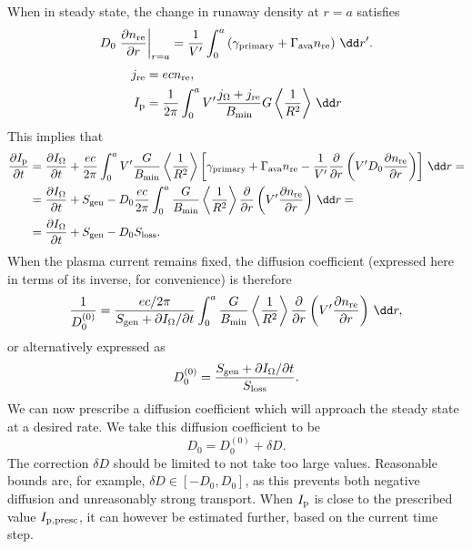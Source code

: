 \documentclass{notes}
\begin{document}
	When in steady state, the change in runaway density at $r=a$ satisfies
	\begin{equation}
		D_0\left.\frac{\partial n_{\rm re}}{\partial r}\right|_{r=a} =
			\frac{1}{V'}\int_0^a \left(
				\gamma_{\rm primary} + \Gamma_{\rm ava}n_{\rm re}
			\right)\,\dd r'.
	\end{equation}
	\begin{equation}
		\begin{aligned}
			j_{\rm re} &= ec n_{\rm re},\\
			I_{\rm p} &= \frac{1}{2\pi}\int_0^a
				V'\frac{j_\Omega + j_{\rm re}}{B_{\rm min}}G
				\left\langle\frac{1}{R^2}\right\rangle\,\dd r
		\end{aligned}
	\end{equation}
	This implies that
	\begin{equation}
		\begin{aligned}
			\frac{\partial I_{\rm p}}{\partial t} &=
				\frac{\partial I_\Omega}{\partial t} +
				\frac{ec}{2\pi}\int_0^a
				V'\frac{G}{B_{\rm min}}\left\langle\frac{1}{R^2}\right\rangle
				\left[
					\gamma_{\rm primary} + \Gamma_{\rm ava}n_{\rm re} -
					\frac{1}{V'}\frac{\partial}{\partial r}
					\left( V'D_0\frac{\partial n_{\rm re}}{\partial r}\right)
				\right]\,\dd r =\\
			&= \frac{\partial I_\Omega}{\partial t} +
				S_{\rm gen} - D_0\frac{ec}{2\pi}\int_0^a
				\frac{G}{B_{\rm min}}\left\langle\frac{1}{R^2}\right\rangle
				\frac{\partial}{\partial r}\left(
					V'\frac{\partial n_{\rm re}}{\partial r}
				\right)\,\dd r =\\
			&= \frac{\partial I_\Omega}{\partial t} + S_{\rm gen} - D_0S_{\rm loss}.
		\end{aligned}
	\end{equation}
	When the plasma current remains fixed, the diffusion coefficient (expressed
	here in terms of its inverse, for convenience) is therefore
	\begin{equation}\label{eq:1OverD0}
		\frac{1}{D_0^{(0)}} =
			\frac{ec/2\pi}{S_{\rm gen}+\partial I_\Omega/\partial t}
			\int_0^a \frac{G}{B_{\rm min}}\left\langle\frac{1}{R^2}\right\rangle
			\frac{\partial}{\partial r}\left(
				V'\frac{\partial n_{\rm re}}{\partial r}
			\right)\,\dd r,
	\end{equation}
	or alternatively expressed as
	\begin{equation}
		D_0^{(0)} = \frac{S_{\rm gen} + \partial I_\Omega/\partial t}{S_{\rm loss}}.
	\end{equation}
	We can now prescribe a diffusion coefficient which will approach the steady
	state at a desired rate. We take this diffusion coefficient to be
	\begin{equation}
		D_0 = D_0^{(0)} + \delta D.
	\end{equation}
	The correction $\delta D$ should be limited to not take too large values.
	Reasonable bounds are, for example, $\delta D\in[-D_0, D_0]$, as this
	prevents both negative diffusion and unreasonably strong transport. When
	$I_{\rm p}$ is close to the prescribed value $I_{\rm p,presc}$, it can
	however be estimated further, based on the current time step.
\end{document}
